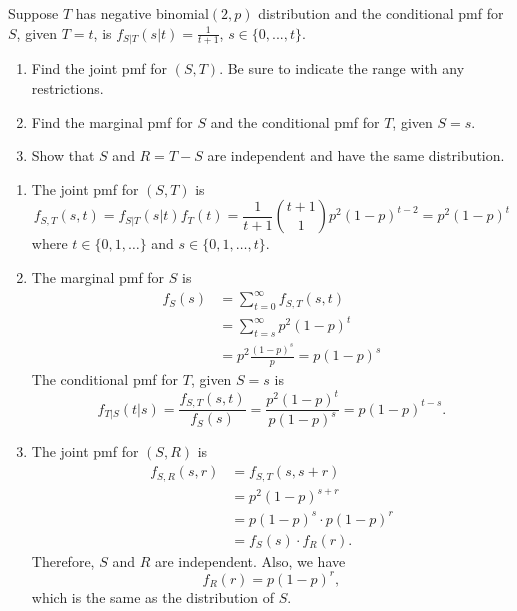 \documentclass[12pt]{article}
\newenvironment{problem}[2][Problem]{\begin{trivlist}
\item[\hskip \labelsep {\bfseries #1}\hskip \labelsep {\bfseries #2.}]}
{\end{trivlist}}
\begin{document}
\begin{problem}{3}
  Suppose $T$ has negative binomial$(2, p)$ distribution and 
  the conditional pmf for $S$, given $T = t$,
  is $f_{S|T} (s|t) = \frac{1}{t+1}$, $s \in \{0, . . . , t\}$.
  \begin{enumerate}
    \item Find the joint pmf for $(S, T)$. Be sure to indicate 
    the range with any restrictions.
    \item Find the marginal pmf for $S$ and the conditional pmf 
    for $T$, given $S = s$.
    \item Show that $S$ and $R = T - S$ are independent and have 
    the same distribution.
  \end{enumerate}
  \begin{enumerate}
    \item The joint pmf for $(S, T)$ is
    \[
      f_{S,T} (s,t) = f_{S|T} (s|t) f_T (t) = 
      \frac{1}{t+1} \binom{t+1}{1} p^2 (1-p)^{t-2}
      = p^2(1-p)^t
    \]
    where $t \in \{0, 1, \ldots\}$ and $s \in \{0, 1, \ldots, t\}$.
    \item The marginal pmf for $S$ is
    \[
      \begin{aligned}
        f_S (s) &= \sum_{t=0}^{\infty} f_{S,T} (s,t) \\
        &= \sum_{t=s}^{\infty} p^2 (1-p)^t\\
        &= p^2\frac{(1-p)^s}{p} = p(1-p)^s
      \end{aligned}
    \]
    The conditional pmf for $T$, given $S = s$ is
    \[
      f_{T|S} (t|s) = \frac{f_{S,T} (s,t)}{f_S (s)} 
      = \frac{p^2(1-p)^t}{p(1-p)^s} = p(1-p)^{t-s}.
    \]
    \item The joint pmf for $(S, R)$ is
    \begin{align*}
      f_{S,R} (s,r) &= f_{S,T} (s, s+r) \\
      &= p^2(1-p)^{s+r} \\
      &= p(1-p)^s \cdot p(1-p)^r \\
      &= f_S (s) \cdot f_R (r).
    \end{align*}
    Therefore, $S$ and $R$ are independent. Also, we have
    \[
      f_R (r) = p(1-p)^r,
    \]
    which is the same as the distribution of $S$.
  \end{enumerate}
\end{problem}

\pagebreak
\end{document}
